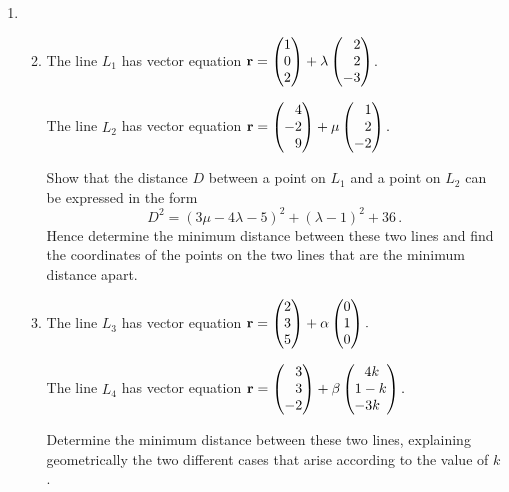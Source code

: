 \documentclass[a4, 11pt]{report}
\newlength{\qspace}
\newcounter{qnumber}
\newenvironment{question}%
 {\vspace{\qspace}
  \begin{enumerate}[\bfseries 1\quad][10]%
    \setcounter{enumi}{\value{qnumber}}%
    \item%
 }
{
  \end{enumerate}
  \filbreak
  \stepcounter{qnumber}
 }
\newenvironment{questionparts}[1][1]%
 {
  \begin{enumerate}[\bfseries (i)]%
    \setcounter{enumii}{#1}
    \addtocounter{enumii}{-1}
    \setlength{\itemsep}{5mm}
    \setlength{\parskip}{8pt}
 }
 {
  \end{enumerate}
 }
\begin{document}
\begin{question}
\begin{questionparts}
\item The line $L_1$ has vector equation
$\displaystyle
{\bf r} =
\begin{pmatrix}
  1 \\
  0 \\
  2
\end{pmatrix}
+
\lambda
\begin{pmatrix}
\hphantom{-}  2 \\
 \hphantom{-} 2 \\
  -3
\end{pmatrix}
$.

The line $L_2$ has vector equation
$\displaystyle
{\bf r} =
\begin{pmatrix}
 \hphantom{-} 4 \\
  -2 \\
 \hphantom{-} 9
 \end{pmatrix}
+
\mu
\begin{pmatrix}
 \hphantom{-} 1 \\
 \hphantom{-} 2 \\
  -2
\end{pmatrix}
.
$

Show that the distance $D$
between a point on $L_1$ and a point on $L_2$
can be expressed in the form
\[
D^2 = \left(3\mu -4 \lambda-5 \right)^2 + \left( \lambda -1 \right)^2 + 36\,.
\]
Hence determine the minimum distance
between these two lines and find the coordinates
of the points on the two lines that are the minimum distance apart.


\item
The line $L_3$ has vector equation
${\bf r} =
\begin{pmatrix}
  2 \\
  3 \\
  5
\end{pmatrix}
+
\alpha
\begin{pmatrix}
  0 \\
  1 \\
  0
\end{pmatrix}
.
$

The line $L_4$ has vector equation
$
{\bf r} =
\begin{pmatrix}
\hphantom{-}  3 \\
\hphantom{-}  3 \\
  -2
\end{pmatrix}
+
\beta
\begin{pmatrix}
\,  4k\\
  1-k \\
 \!\!\! -3k
\end{pmatrix}
.
$

Determine the minimum distance between these two lines,
explaining geometrically the two different cases that arise
 according to the value of $k$.


\end{questionparts}
\end{question}
		
\end{document}
